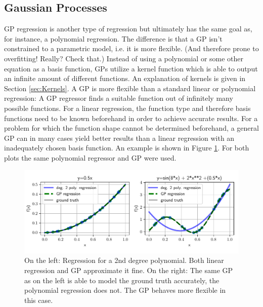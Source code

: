 \documentclass[%
  a4paper,oneside,%
  11pt,%
  smallchapters,
  style=printdev,
  extramargin,
  green,%
  rgb, <cmyk>
  ]{tubsbook}
\begin{document}














\subsection{Gaussian Processes}
\label{sec:GPIntro}
GP regression is another type of regression but ultimately has the same goal as, for instance, a polynomial regression. The difference is that a GP isn't constrained to a parametric model, i.e. it is more flexible. (And therefore prone to overfitting! Really? Check that.) Instead of using a polynomial or some other equation as a basis function, GPs utilize a kernel function which is able to output an infinite amount of different functions. An explanation of kernels is given in Section \ref{sec:Kernels}.
A GP is more flexible than a standard linear or polynomial regression: A GP regressor finds a suitable function out of infinitely many possible functions. For a linear regression, the function type and therefore basis functions need to be known beforehand in order to achieve accurate results. For a problem for which the function shape cannot be determined beforehand, a general GP can in many cases yield better results than a linear regression with an inadequately chosen basis function. An example is shown in Figure \ref{fig:GPvsReg}. For both plots the same polynomial regressor and GP were used.
\begin{figure}[!ht]
\begin{center}
\includegraphics[width=1\textwidth]{pics/GPvsReg}
\caption[GP regression versus Linear regression]{On the left: Regression for a 2nd degree polynomial. Both linear regression and GP approximate it fine. On the right: The same GP as on the left is able to model the ground truth accurately, the polynomial regression does not. The GP behaves more flexible in this case.}
\label{fig:GPvsReg}
\end{center}
\end{figure}
\end{document}
